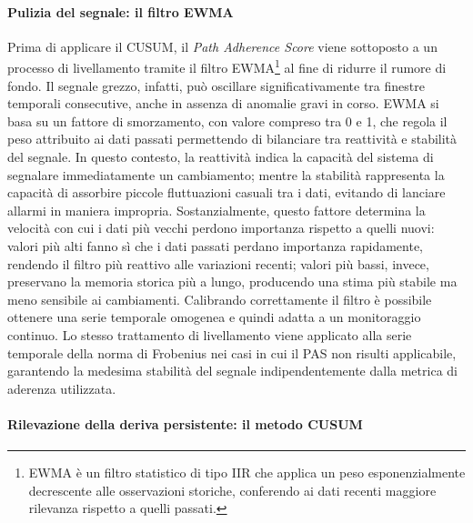 \paragraph{Pulizia del segnale: il filtro \gls{EWMA}}

Prima di applicare il \gls{CUSUM}, il \textit{Path Adherence Score} viene sottoposto a un processo
di livellamento tramite il filtro \gls{EWMA}\footnote{\gls{EWMA} è un filtro statistico di tipo 
\gls{IIR} che applica un peso esponenzialmente decrescente alle osservazioni storiche, conferendo 
ai dati recenti maggiore rilevanza rispetto a quelli passati.} al fine di ridurre il rumore di fondo. Il segnale grezzo, infatti,
può oscillare significativamente tra finestre temporali consecutive, anche in assenza di anomalie
gravi in corso. \gls{EWMA} si basa su un fattore di smorzamento, con valore compreso tra 0 e 1,
che regola il peso attribuito ai dati passati permettendo di bilanciare tra reattività e stabilità
del segnale. In questo contesto, la reattività indica la capacità del sistema di segnalare
immediatamente un cambiamento; mentre la stabilità rappresenta la capacità di assorbire piccole
fluttuazioni casuali tra i dati, evitando di lanciare allarmi in maniera impropria.
Sostanzialmente, questo fattore determina la velocità con cui i dati più vecchi perdono importanza
rispetto a quelli nuovi: valori più alti fanno sì che i dati passati perdano importanza rapidamente,
rendendo il filtro più reattivo alle variazioni recenti; valori più bassi, invece, preservano la
memoria storica più a lungo, producendo una stima più stabile ma meno sensibile ai cambiamenti.
Calibrando correttamente il filtro è possibile ottenere una serie temporale omogenea e quindi adatta
a un monitoraggio continuo. Lo stesso trattamento di livellamento viene applicato alla serie
temporale della norma di Frobenius nei casi in cui il \gls{PAS} non risulti applicabile, garantendo
la medesima stabilità del segnale indipendentemente dalla metrica di aderenza utilizzata.

\paragraph{Rilevazione della deriva persistente: il metodo \gls{CUSUM}}

